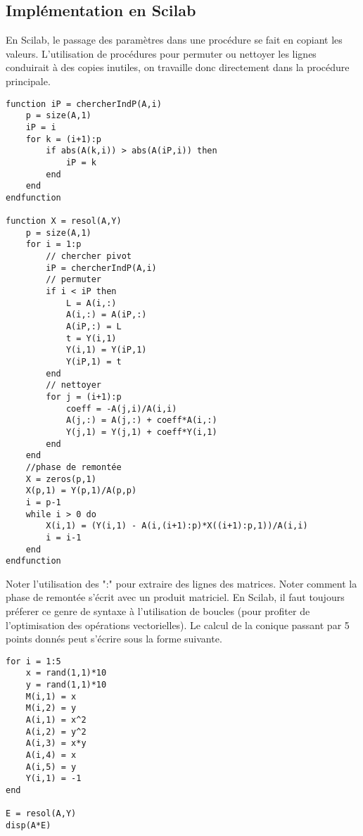 \subsection{Implémentation en Scilab}
En Scilab, le passage des paramètres dans une procédure se fait en copiant les valeurs. L'utilisation de procédures pour permuter ou nettoyer les lignes conduirait à des copies inutiles, on travaille donc directement dans la procédure principale.
\begin{verbatim}
function iP = chercherIndP(A,i)
    p = size(A,1)
    iP = i
    for k = (i+1):p
        if abs(A(k,i)) > abs(A(iP,i)) then 
            iP = k
        end
    end
endfunction

function X = resol(A,Y)
    p = size(A,1)
    for i = 1:p
        // chercher pivot
        iP = chercherIndP(A,i)
        // permuter
        if i < iP then
            L = A(i,:)
            A(i,:) = A(iP,:)
            A(iP,:) = L 
            t = Y(i,1)
            Y(i,1) = Y(iP,1)
            Y(iP,1) = t
        end
        // nettoyer
        for j = (i+1):p
            coeff = -A(j,i)/A(i,i)
            A(j,:) = A(j,:) + coeff*A(i,:)
            Y(j,1) = Y(j,1) + coeff*Y(i,1)
        end
    end
    //phase de remontée
    X = zeros(p,1)
    X(p,1) = Y(p,1)/A(p,p)
    i = p-1
    while i > 0 do
        X(i,1) = (Y(i,1) - A(i,(i+1):p)*X((i+1):p,1))/A(i,i)
        i = i-1
    end 
endfunction  
\end{verbatim}
Noter l'utilisation des ":" pour extraire des lignes des matrices.\newline
Noter comment la phase de remontée s'écrit avec un produit matriciel. En Scilab, il faut toujours préferer ce genre de syntaxe à l'utilisation de boucles (pour profiter de l'optimisation des opérations vectorielles).\newline
Le calcul de la conique passant par 5 points donnés peut s'écrire sous la forme suivante.
\begin{verbatim}
for i = 1:5
    x = rand(1,1)*10
    y = rand(1,1)*10
    M(i,1) = x
    M(i,2) = y
    A(i,1) = x^2
    A(i,2) = y^2
    A(i,3) = x*y
    A(i,4) = x
    A(i,5) = y
    Y(i,1) = -1
end

E = resol(A,Y)
disp(A*E)
\end{verbatim}


